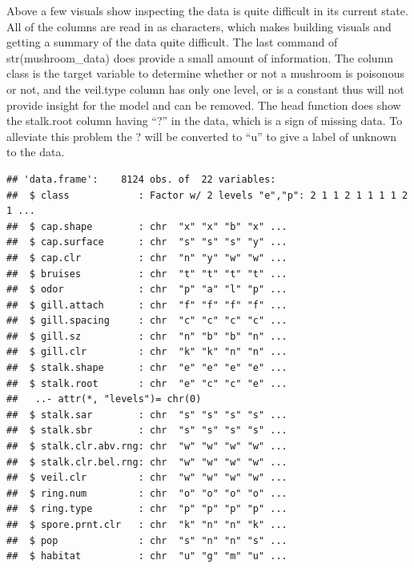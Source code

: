 \documentclass[
  english,
  man]{apa6}
\newenvironment{Shaded}{\begin{snugshade}}{\end{snugshade}}
\newcommand{\CommentTok}[1]{\textcolor[rgb]{0.56,0.35,0.01}{\textit{#1}}}
\newcommand{\DataTypeTok}[1]{\textcolor[rgb]{0.13,0.29,0.53}{#1}}
\newcommand{\KeywordTok}[1]{\textcolor[rgb]{0.13,0.29,0.53}{\textbf{#1}}}
\newcommand{\NormalTok}[1]{#1}
\newcommand{\OperatorTok}[1]{\textcolor[rgb]{0.81,0.36,0.00}{\textbf{#1}}}
\newcommand{\StringTok}[1]{\textcolor[rgb]{0.31,0.60,0.02}{#1}}
\begin{document}
Above a few visuals show inspecting the data is quite difficult in its current state. All of the columns are read in as characters, which makes building visuals and getting a summary of the data quite difficult. The last command of str(mushroom\_data) does provide a small amount of information. The column class is the target variable to determine whether or not a mushroom is poisonous or not, and the veil.type column has only one level, or is a constant thus will not provide insight for the model and can be removed. The head function does show the stalk.root column having \enquote{?} in the data, which is a sign of missing data. To alleviate this problem the ? will be converted to \enquote{u} to give a label of unknown to the data.

\begin{Shaded}
\end{Shaded}

\begin{verbatim}
## 'data.frame':    8124 obs. of  22 variables:
##  $ class            : Factor w/ 2 levels "e","p": 2 1 1 2 1 1 1 1 2 1 ...
##  $ cap.shape        : chr  "x" "x" "b" "x" ...
##  $ cap.surface      : chr  "s" "s" "s" "y" ...
##  $ cap.clr          : chr  "n" "y" "w" "w" ...
##  $ bruises          : chr  "t" "t" "t" "t" ...
##  $ odor             : chr  "p" "a" "l" "p" ...
##  $ gill.attach      : chr  "f" "f" "f" "f" ...
##  $ gill.spacing     : chr  "c" "c" "c" "c" ...
##  $ gill.sz          : chr  "n" "b" "b" "n" ...
##  $ gill.clr         : chr  "k" "k" "n" "n" ...
##  $ stalk.shape      : chr  "e" "e" "e" "e" ...
##  $ stalk.root       : chr  "e" "c" "c" "e" ...
##   ..- attr(*, "levels")= chr(0) 
##  $ stalk.sar        : chr  "s" "s" "s" "s" ...
##  $ stalk.sbr        : chr  "s" "s" "s" "s" ...
##  $ stalk.clr.abv.rng: chr  "w" "w" "w" "w" ...
##  $ stalk.clr.bel.rng: chr  "w" "w" "w" "w" ...
##  $ veil.clr         : chr  "w" "w" "w" "w" ...
##  $ ring.num         : chr  "o" "o" "o" "o" ...
##  $ ring.type        : chr  "p" "p" "p" "p" ...
##  $ spore.prnt.clr   : chr  "k" "n" "n" "k" ...
##  $ pop              : chr  "s" "n" "n" "s" ...
##  $ habitat          : chr  "u" "g" "m" "u" ...
\end{verbatim}
\end{document}

